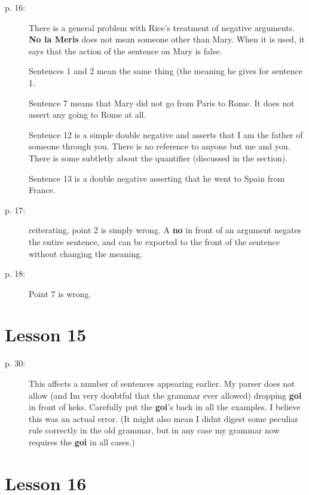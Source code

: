 \documentclass[12pt]{article}
\begin{document}
\begin{description}

\item[p. 16:]  There is a general problem with Rice's treatment of negative arguments.  {\bf No la Meris} does not mean someone other than Mary.  When it is used, it says that the action of the sentence on Mary is false.

Sentences 1 and 2 mean the same thing (the meaning he gives for sentence 1.

Sentence 7 means that Mary did not go from Paris to Rome.  It does not assert any going to Rome at all.

Sentence 12 is a simple double negative and asserts that I am the father of someone through you.  There is no reference to anyone but me and you.  There is some subtletly about the quantifier (discussed in the section).

Sentence 13 is a double negative asserting that he went to Spain from France.

\item[p. 17:]  reiterating, point 2 is simply wrong.  A {\bf no} in front of an argument negates the entire sentence, and can be exported to the front of the sentence without changing the meaning.

\item[p. 18:]  Point 7 is wrong.



\end{description}

\section{Lesson 15}

\begin{description}

\item[p. 30:]  This affects a number of sentences appearing earlier.  My parser does not allow (and Im very doubtful that the grammar ever allowed) dropping {\bf goi} in front of keks.  Carefully put the {\bf goi}'s back in all the examples.  I believe this was an actual error.  (It might also mean I didnt digest some peculiar rule correctly in the old grammar, but in any case my grammar now requires the {\bf goi} in all cases.)

\end{description}

\section{Lesson 16}
\end{document}
